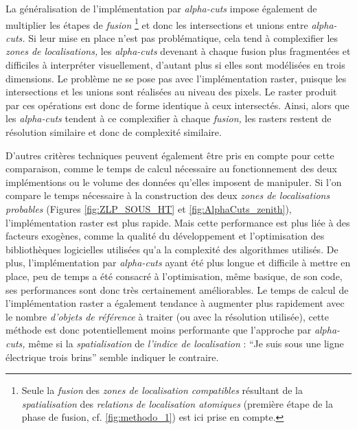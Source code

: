 La généralisation de l'implémentation par \emph{alpha-cuts} impose
également de multiplier les étapes de \emph{fusion} \footnote{Seule la
  \emph{fusion} des \emph{zones de localisation compatibles} résultant
  de la \emph{spatialisation} des \emph{relations de localisation
    atomiques} (première étape de la phase de fusion,
  cf. \autoref{fig:methodo_1}) est ici prise en compte.} et donc les
intersections et unions entre \emph{alpha-cuts.} Si leur mise en place
n'est pas problématique, cela tend à complexifier les \emph{zones de
  localisations,} les \emph{alpha-cuts} devenant à chaque fusion plus
fragmentées et difficiles à interpréter visuellement, d'autant plus si
elles sont modélisées en trois dimensions. Le problème ne se pose pas
avec l'implémentation raster, puisque les intersections et les unions
sont réalisées au niveau des pixels. Le raster produit par ces
opérations est donc de forme identique à ceux intersectés. Ainsi,
alors que les \emph{alpha-cuts} tendent à ce complexifier à chaque
\emph{fusion,} les rasters restent de résolution similaire et donc de
complexité similaire.

D'autres critères techniques peuvent également être pris en compte
pour cette comparaison, comme le temps de calcul nécessaire au
fonctionnement des deux implémentions ou le volume des données
qu'elles imposent de manipuler. Si l'on compare le temps nécessaire à
la construction des deux \emph{zones de localisations probables}
(Figures \ref{fig:ZLP_SOUS_HT} et \ref{fig:AlphaCuts_zenith}),
l'implémentation raster est plus rapide. Mais cette performance est
plus liée à des facteurs exogènes, comme la qualité du développement
et l'optimisation des bibliothèques logicielles utilisées qu'a la
complexité des algorithmes utilisés. De plus, l'implémentation par
\emph{alpha-cuts} ayant été plus longue et difficile à mettre en
place, peu de temps a été consacré à l'optimisation, même basique, de
son code, ses performances sont donc très certainement
améliorables. Le temps de calcul de l'implémentation raster a
également tendance à augmenter plus rapidement avec le nombre
\emph{d'objets de référence} à traiter (ou avec la résolution
utilisée), cette méthode est donc potentiellement moins performante
que l'approche par \emph{alpha-cuts,} même si la \emph{spatialisation}
de \emph{l'indice de localisation} : \enquote{Je suis sous une ligne
  électrique trois brins} semble indiquer le contraire.

